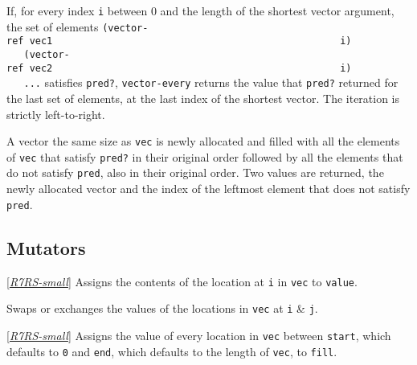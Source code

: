 \begin{entry}{%
  }

  If, for every index \texttt{i} between 0 and the
  length of the shortest vector argument, the set of elements
  \texttt{(vector-ref~vec1~~~~~~~~~~~~~~~~~~~~~~~~~~~~~~~~~~~~~~~~~~~~~~~~~~i)~~~~~~~~~~~~~(vector-ref~vec2~~~~~~~~~~~~~~~~~~~~~~~~~~~~~~~~~~~~~~~~~~~~~~~~~~i)~~~~~~~~~~~~~...}
  satisfies \texttt{pred?}, \texttt{vector-every} returns the value
  that \texttt{pred?} returned for the last set of elements, at the
  last index of the shortest vector. The iteration is strictly
  left-to-right.
\end{entry}

\begin{entry}{%
  }
 
  A vector the same size as \texttt{vec} is newly allocated and filled
  with all the elements of \texttt{vec} that satisfy \texttt{pred?} in
  their original order followed by all the elements that do not
  satisfy \texttt{pred}, also in their original order.  Two values are
  returned, the newly allocated vector and the index of the leftmost
  element that does not satisfy \texttt{pred}.
\end{entry}

\subsection{Mutators}


\begin{entry}{%
  }

  {[}\protect\hyperlink{R7RS-small}{\emph{R7RS-small}}{]} Assigns the
  contents of the location at \texttt{i} in \texttt{vec} to
  \texttt{value}.
\end{entry}

\begin{entry}{%
  }

  Swaps or exchanges the values of the locations in \texttt{vec} at
  \texttt{i} \& \texttt{j}.
\end{entry}

\begin{entry}{%
  }

  {[}\protect\hyperlink{R7RS-small}{\emph{R7RS-small}}{]} Assigns the
  value of every location in \texttt{vec} between \texttt{start},
  which defaults to \texttt{0} and \texttt{end}, which defaults to the
  length of \texttt{vec}, to \texttt{fill}.
\end{entry}

